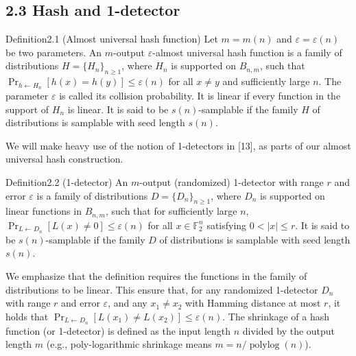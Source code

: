\subsection*{2.3 Hash and 1-detector}
\begin{authorclaim}{Definition2.1 (Almost universal hash function)}
Let $m=m(n)$ and $\varepsilon=\varepsilon(n)$ be two parameters. An $m$-output $\varepsilon$-almost universal hash function is a family of distributions $H=\{H_n\}_{n\ge1}$, where $H_n$ is supported on $B_{n,m}$, such that $\Pr_{h\leftarrow H_n}[h(x)=h(y)]\le\varepsilon(n)$ for all $x\ne y$ and sufficiently large $n$. The parameter $\varepsilon$ is called its collision probability. It is linear if every function in the support of $H_n$ is linear. It is said to be $s(n)$-samplable if the family $H$ of distributions is samplable with seed length $s(n)$.
\end{authorclaim}
We will make heavy use of the notion of 1-detectors in [13], as parts of our almost universal hash construction.
\begin{authorclaim}{Definition2.2 (1-detector)}
An $m$-output (randomized) 1-detector with range $r$ and error $\varepsilon$ is a family of distributions $D=\{D_n\}_{n\ge1}$, where $D_n$ is supported on linear functions in $B_{n,m}$, such that for sufficiently large $n$, $\Pr_{L\leftarrow D_n}[L(x)\ne0]\le\varepsilon(n)$ for all $x\in\mathbb F_2^n$ satisfying $0<|x|\le r$. It is said to be $s(n)$-samplable if the family $D$ of distributions is samplable with seed length $s(n)$.
\end{authorclaim}
We emphasize that the definition requires the functions in the family of distributions to be linear. This ensure that, for any randomized 1-detector $D_n$ with range $r$ and error $\varepsilon$, and any $x_1\ne x_2$ with Hamming distance at most $r$, it holds that $\Pr_{L\leftarrow D_n}[L(x_1)\ne L(x_2)]\le\varepsilon(n)$. The shrinkage of a hash function (or 1-detector) is defined as the input length $n$ divided by the output length $m$ (e.g., poly-logarithmic shrinkage means $m=n/\operatorname{polylog}(n)$).
